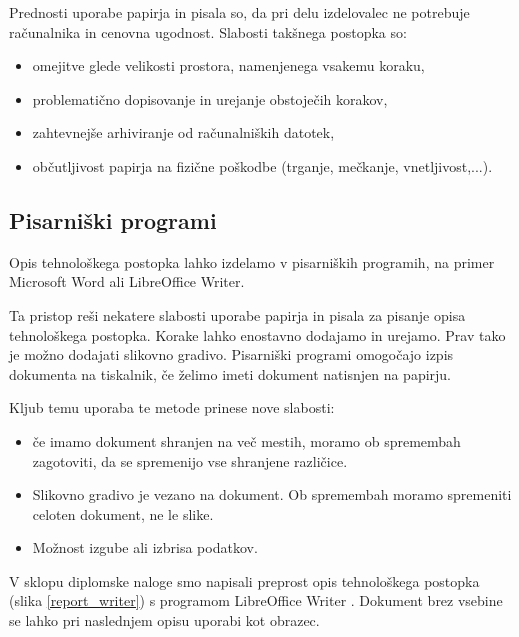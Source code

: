 \documentclass[a4paper, 12pt]{book}
\begin{document}
Prednosti uporabe papirja in pisala so, da pri delu izdelovalec ne potrebuje računalnika in cenovna ugodnost.
Slabosti takšnega postopka so:
\begin{itemize}
	\item omejitve glede velikosti prostora, namenjenega vsakemu koraku,
	\item problematično dopisovanje in urejanje obstoječih korakov,
	\item zahtevnejše arhiviranje od računalniških datotek,
	\item občutljivost papirja na fizične poškodbe (trganje, mečkanje, vnetljivost,...).
\end{itemize}


\subsection{Pisarniški programi}

Opis tehnološkega postopka lahko izdelamo v pisarniških programih, na primer Microsoft Word ali LibreOffice Writer.

Ta pristop reši nekatere slabosti uporabe papirja in pisala za pisanje opisa tehnološkega postopka.
Korake lahko enostavno dodajamo in urejamo.
Prav tako je možno dodajati slikovno gradivo.
Pisarniški programi omogočajo izpis dokumenta na tiskalnik, če želimo imeti dokument natisnjen na papirju.

Kljub temu uporaba te metode prinese nove slabosti:
\begin{itemize}
	\item če imamo dokument shranjen na več mestih, moramo ob spremembah zagotoviti, da se spremenijo vse shranjene različice. 
	\item Slikovno gradivo je vezano na dokument. Ob spremembah moramo spremeniti celoten dokument, ne le slike.
	\item Možnost izgube ali izbrisa podatkov.
\end{itemize}

V sklopu diplomske naloge smo napisali preprost opis tehnološkega postopka (slika \ref{report_writer}) s programom LibreOffice Writer \cite{writer}.
Dokument brez vsebine se lahko pri naslednjem opisu uporabi kot obrazec.
\end{document}
